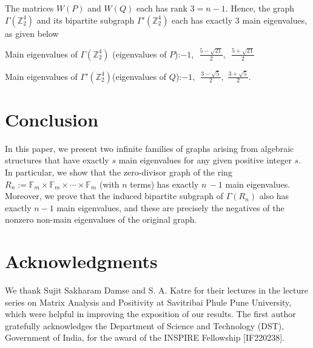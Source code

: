 \documentclass[11pt,oneside]{article}
\theoremstyle{plain}
\theoremstyle{plain}
\theoremstyle{definition}
\numberwithin{figure}{section}
\theoremstyle{remark}
\numberwithin{equation}{section}
\begin{document}
		
		
		The matrices $W(P)$ and $W(Q)$ each has rank $ 3 = n-1.$ Hence, the graph $\Gamma(\mathbb{Z}_2^4)$ and its bipartite subgraph $\Gamma'(\mathbb{Z}_2^4)$ each has exactly $3$ main eigenvalues, as given below
		
		Main eigenvalues of $\Gamma(\mathbb{Z}_2^4)$  (eigenvalues of $P$):\quad $-1,$\, $\frac{5 -\sqrt{21}}{2},$\, $\frac{5 +\sqrt{21}}{2}$
		
		Main eigenvalues of $\Gamma'(\mathbb{Z}_2^4)$(eigenvalues of $Q$):\quad $-1,$\, $\frac{3 -\sqrt{5}}{2}$,\,  $\frac{3 +\sqrt{5}}{2}$.
		
		\section{Conclusion}
		\noindent
		In this paper, we present two infinite families of graphs arising from algebraic structures that have exactly \(s\) main eigenvalues for any given positive integer \(s\). In particular, we show that the zero-divisor graph of the ring $
		R_n := \mathbb{F}_m \times \mathbb{F}_m \times \cdots \times \mathbb{F}_m $
		(with \(n\) terms) has exactly  \(n\,- 1\) main eigenvalues. Moreover, we prove that the induced bipartite subgraph of \(\Gamma(R_n)\) also has exactly \(n-1\) main eigenvalues, and these are precisely the negatives of the nonzero non-main eigenvalues of the original graph.
		
		\section*{Acknowledgments}
		\noindent
		We thank Sujit Sakharam Damse and  S. A. Katre for their lectures in the lecture series on Matrix Analysis and Positivity at Savitribai Phule Pune University, which were helpful  in improving the exposition of our results.  The first author gratefully acknowledges the Department of Science and Technology (DST), Government of India, for the award of the INSPIRE Fellowship [IF220238].
		
		
		
\end{document}
